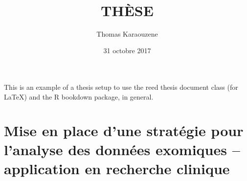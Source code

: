 \documentclass[12pt,twoside]{reedthesis}
\title{THÈSE}
\author{Thomas Karaouzene}
\date{31 octobre 2017}
\theoremstyle{definition}
\theoremstyle{definition}
\theoremstyle{remark}
\begin{document}
      \maketitle
  
  \frontmatter %
  \pagestyle{empty} %

  
      \begin{preface}
      This is an example of a thesis setup to use the reed thesis document
      class (for LaTeX) and the R bookdown package, in general.
    \end{preface}
  
      \hypersetup{linkcolor=black}
    \setcounter{tocdepth}{3}
    \tableofcontents
  
      \listoftables
  
      \listoffigures
  
  
  
  \mainmatter %
  \pagestyle{fancyplain} %

  \chapter{Mise en place d'une stratégie pour l'analyse des données
  exomiques -- application en recherche
  clinique}\label{mise-en-place-dune-strategie-pour-lanalyse-des-donnees-exomiques-application-en-recherche-clinique}
  
  \newpage
  
\end{document}
